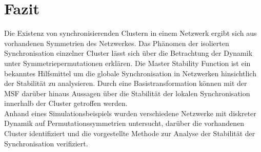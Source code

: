 \section{Fazit}\label{fazit}
Die Existenz von synchronisierenden Clustern in einem Netzwerk ergibt sich aus vorhandenen Symmetrien des Netzwerkes. Das Phänomen der isolierten Synchronisation einzelner Cluster lässt sich über die Betrachtung der Dynamik unter Symmetriepermutationen erklären. 
Die Master Stability Function ist ein bekanntes Hilfsmittel um die globale Synchronisation in Netzwerken hinsichtlich der Stabilität zu analysieren. Durch eine Basistransformation \cite{pecora2014} können mit der MSF darüber hinaus Aussagen über die Stabilität der lokalen Synchronisation innerhalb der Cluster getroffen werden.\\
Anhand eines Simulationsbeispiels wurden verschiedene Netzwerke mit diskreter Dynamik auf Permutationssymmetrien untersucht, darüber die vorhandenen Cluster identifiziert und die vorgestellte Methode zur Analyse der Stabilität der Synchronisation verifiziert.
